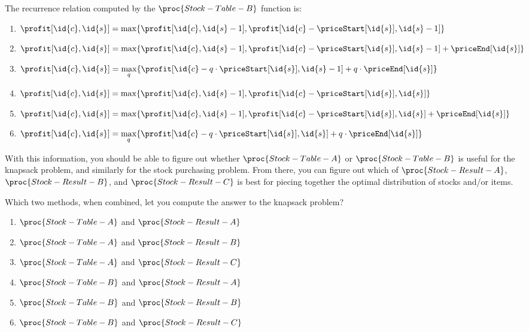 \documentclass[12pt,twoside]{article}
\newcommand{\answerIIo}{\solution{
1
}}
\begin{document}
\begin{problems}
\begin{problemparts}
\problempart
{}
The recurrence relation computed
by the $\proc{Stock-Table-B}$ function
is:
\begin{enumerate}
\item $\profit[\id{c}, \id{s}] = \displaystyle\max\{ \profit[\id{c}, \id{s}- 1], \profit[\id{c} - \priceStart[\id{s}], \id{s} - 1] \}$
\item $\profit[\id{c}, \id{s}] = \displaystyle\max\{ \profit[\id{c}, \id{s}- 1], \profit[\id{c} - \priceStart[\id{s}], \id{s} - 1] + \priceEnd[\id{s}]\}$
\item $\profit[\id{c}, \id{s}] = \displaystyle\max_q \{ \profit[\id{c} - q \cdot \priceStart[\id{s}], \id{s} - 1 ]+ q \cdot \priceEnd[\id{s}] \}$
\item $\profit[\id{c}, \id{s}] = \displaystyle\max\{ \profit[\id{c}, \id{s}- 1], \profit[\id{c} - \priceStart[\id{s}], \id{s} ] \}$
\item $\profit[\id{c}, \id{s}] = \displaystyle\max\{ \profit[\id{c}, \id{s}- 1], \profit[\id{c} - \priceStart[\id{s}], \id{s} ]+ \priceEnd[\id{s}] \}$
\item $\profit[\id{c}, \id{s}] = \displaystyle\max_q\{ \profit[\id{c} - q \cdot \priceStart[\id{s}], \id{s} ]+ q \cdot \priceEnd[\id{s}] \}$
\end{enumerate}

\answerIIo

\end{problemparts}

With this information,
you should be able to figure out
whether
$\proc{Stock-Table-A}$
or
$\proc{Stock-Table-B}$
is useful for the knapsack problem,
and similarly for the stock purchasing problem.
From there,
you can figure out which of
$\proc{Stock-Result-A}$,
$\proc{Stock-Result-B}$, and
$\proc{Stock-Result-C}$
is best for piecing together
the optimal distribution of stocks and/or items.

\begin{problemparts}
\problempart
{}
Which two methods, when combined,
let you compute the answer to the knapsack problem?
\begin{enumerate}
\item $\proc{Stock-Table-A}$ and $\proc{Stock-Result-A}$
\item $\proc{Stock-Table-A}$ and $\proc{Stock-Result-B}$
\item $\proc{Stock-Table-A}$ and $\proc{Stock-Result-C}$
\item $\proc{Stock-Table-B}$ and $\proc{Stock-Result-A}$
\item $\proc{Stock-Table-B}$ and $\proc{Stock-Result-B}$
\item $\proc{Stock-Table-B}$ and $\proc{Stock-Result-C}$
\end{enumerate}


\end{problemparts}
\end{problems}
\end{document}
